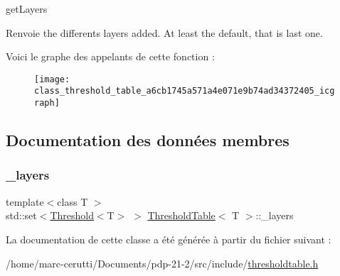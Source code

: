 get\+Layers 

\begin{DoxyReturn}{Renvoie}
the differents layers added. At least the default, that is last one. 
\end{DoxyReturn}
Voici le graphe des appelants de cette fonction \+:\nopagebreak
\begin{figure}[H]
\begin{center}
\leavevmode
\texttt{[image: class\_threshold\_table\_a6cb1745a571a4e071e9b74ad34372405\_icgraph]}
\end{center}
\end{figure}


\subsection{Documentation des données membres}
\mbox{\label{class_threshold_table_aa85ce39b849283e9fd2a26d6571646a2}} 
\subsubsection{\texorpdfstring{\+\_\+layers}{\_layers}}
{\footnotesize\ttfamily template$<$class T $>$ \\
std\+::set$<$\hyperlink{struct_threshold}{Threshold}$<$T$>$ $>$ \hyperlink{class_threshold_table}{Threshold\+Table}$<$ T $>$\+::\+\_\+layers\hspace{0.3cm}{\ttfamily [private]}}



La documentation de cette classe a été générée à partir du fichier suivant \+:\begin{DoxyCompactItemize}
\item 
/home/marc-\/cerutti/\+Documents/pdp-\/21-\/2/src/include/\hyperlink{thresholdtable_8h}{thresholdtable.\+h}\end{DoxyCompactItemize}
